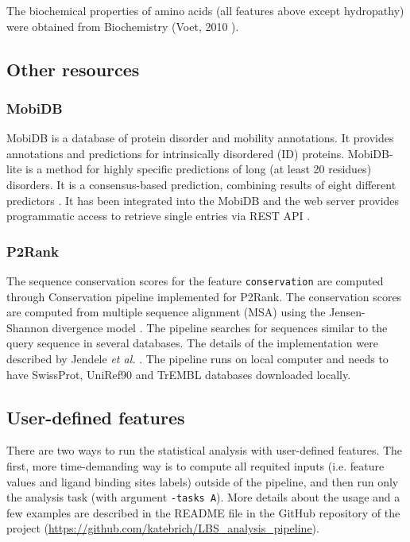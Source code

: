 The biochemical properties of amino acids (all features above except hydropathy) were obtained from Biochemistry (Voet, 2010 \cite{voet}).

\subsection{Other resources}

\subsubsection{MobiDB}

MobiDB is a database of protein disorder and mobility annotations. It provides annotations and predictions for intrinsically disordered (ID) proteins. MobiDB-lite is a method for highly specific predictions of long (at least 20 residues) disorders. It is a consensus-based prediction, combining results of eight different predictors
\cite{mobidb}. It has been integrated into the MobiDB and the web server provides programmatic access to retrieve single entries via REST API \cite{mobidbApi}.

\subsubsection{P2Rank} \label{s:conservation}

The sequence conservation scores for the feature \texttt{conservation} are computed through Conservation pipeline \cite{conservation} implemented for P2Rank. The conservation scores are computed from multiple sequence alignment (MSA) using the Jensen-Shannon divergence model \cite{jensen}. The pipeline searches for sequences similar to the query sequence in several databases. The details of the implementation were described by Jendele \textit{et al.} \cite{prankweb}.
The pipeline runs on local computer and needs to have SwissProt, UniRef90 and TrEMBL databases downloaded locally.

\subsection{User-defined features}

There are two ways to run the statistical analysis with user-defined features. The first, more time-demanding way is to compute all requited inputs (i.e. feature values and ligand binding sites labels) outside of the pipeline, and then run only the analysis task (with argument \texttt{-tasks A}). More details about the usage and a few  examples are described in the README file in the GitHub repository of the project (\url{https://github.com/katebrich/LBS_analysis_pipeline}).

